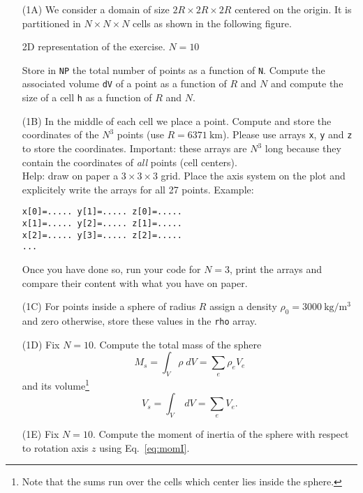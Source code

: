 \begin{itemize}
\item[(1A)] We consider a domain of size $2R\times 2R \times 2R$ centered on the origin. It is 
partitioned in $N\times N \times N$ cells as shown in the following figure.

\begin{center}

{\captionfont 2D representation of the exercise. $N=10$}
\end{center}


Store in {\tt NP} the total number of points as a function of {\tt N}.
Compute the associated volume {\tt dV} of a point as a function of $R$ and $N$ and  
compute the size of a cell {\tt h} as a function of $R$ and $N$. 

\item[(1B)] 
In the middle of each cell we place a point. Compute and store the coordinates 
of the $N^3$ points (use $R=6371~\si{\kilo\metre}$). Please use 
arrays {\tt x}, {\tt y} and {\tt z} to store the coordinates.
Important: these arrays are $N^3$ long because they contain the coordinates of {\it all} points (cell centers).\\
Help: draw on paper a $3\times3\times3$ grid. Place the axis system on the plot and explicitely write the arrays 
for all 27 points. Example:
\begin{verbatim}
x[0]=..... y[1]=..... z[0]=.....
x[1]=..... y[2]=..... z[1]=.....
x[2]=..... y[3]=..... z[2]=.....
...
\end{verbatim}
Once you have done so, run your code for $N=3$, print the arrays and compare their content with what you 
have on paper.


\item[(1C)] For points inside a sphere of radius $R$ assign a 
density $\rho_0=3000~\si{\kilo\gram\per\cubic\metre}$ 
and zero otherwise, store these values in the {\tt rho} array.

\item[(1D)] Fix $N=10$. Compute the total mass of the sphere
\[
M_s = \int_V \rho \; dV = \sum_{e} \rho_e V_e
\] 
and its volume\footnote{Note that the sums run over the cells which center lies inside the sphere.}
\[
V_s = \int_V \; dV = \sum_{e}  V_e.
\] 

\item[(1E)] Fix $N=10$. Compute the moment of inertia of the sphere 
with respect to rotation axis $z$ using Eq.~\eqref{eq:momI}. 


\end{itemize}
